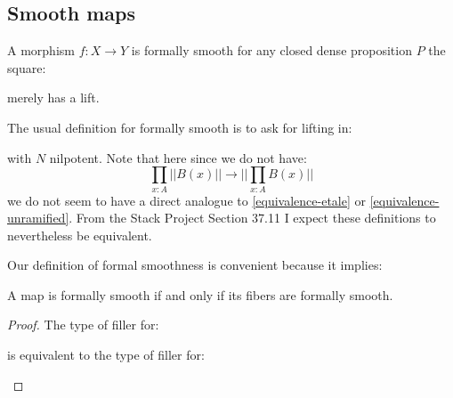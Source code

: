 \subsection{Smooth maps}

\begin{definition}
A morphism $f:X\to Y$ is formally smooth for any closed dense proposition $P$ the square:
 \begin{center}
    \end{center}
merely has a lift.
\end{definition}

\begin{remark}
The usual definition for formally smooth is to ask for lifting in:
 \begin{center}
    \end{center}
    with $N$ nilpotent. Note that here since we do not have: 
\[
\prod_{x:A} ||B(x)|| \to ||\prod_{x:A}B(x)||
\]
we do not seem to have a direct analogue to \cref{equivalence-etale} or \cref{equivalence-unramified}. From the Stack Project Section 37.11 I expect these definitions to nevertheless be  equivalent.
\end{remark}

Our definition of formal smoothness is convenient because it implies:

\begin{lemma}
A map is formally smooth if and only if its fibers are formally smooth.
\end{lemma}
\begin{proof}
The type of filler for:
 \begin{center}
    \end{center}
   is equivalent to the type of filler for:
    \begin{center}
    \end{center}
\end{proof}

